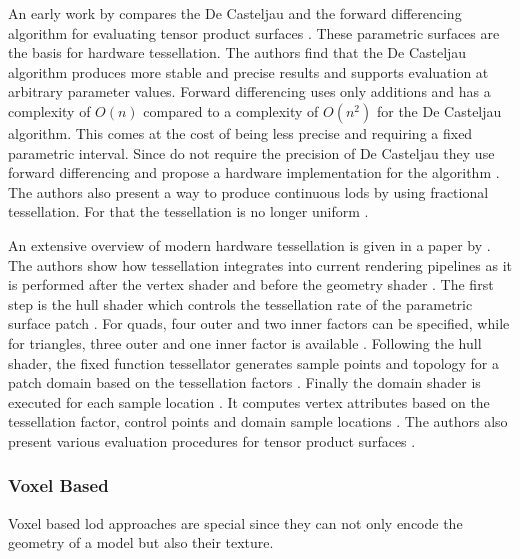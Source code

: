An early work by \citeauthor{moreton_tessellation} compares the De Casteljau and the forward differencing algorithm for evaluating tensor product surfaces \cite{moreton_tessellation}.
These parametric surfaces are the basis for hardware tessellation.
The authors find that the De Casteljau algorithm produces more stable and precise results and supports evaluation at arbitrary parameter values.
Forward differencing uses only additions and has a complexity of $O(n)$ compared to a complexity of $O(n^2)$ for the De Casteljau algorithm.
This comes at the cost of being less precise and requiring a fixed parametric interval.
Since \citeauthor{moreton_tessellation} do not require the precision of De Casteljau they use forward differencing and propose a hardware implementation for the algorithm \cite{moreton_tessellation}.
The authors also present a way to produce continuous \acp{lod} by using fractional tessellation.
For that the tessellation is no longer uniform \cite{moreton_tessellation}.

An extensive overview of modern hardware tessellation is given in a paper by \citeauthor{niessner_tessellation} \cite{niessner_tessellation}.
The authors show how tessellation integrates into current rendering pipelines as it is performed after the vertex shader and before the geometry shader \cite{niessner_tessellation}.
The first step is the hull shader which controls the tessellation rate of the parametric surface patch \cite{niessner_tessellation}.
For quads, four outer and two inner factors can be specified, while for triangles, three outer and one inner factor is available \cite{niessner_tessellation}.
Following the hull shader, the fixed function tessellator generates sample points and topology for a patch domain based on the tessellation factors \cite{niessner_tessellation}.
Finally the domain shader is executed for each sample location \cite{niessner_tessellation}.
It computes vertex attributes based on the tessellation factor, control points and domain sample locations \cite{niessner_tessellation}.
The authors also present various evaluation procedures for tensor product surfaces \cite{niessner_tessellation}.

\subsubsection*{Voxel Based}
Voxel based \ac{lod} approaches are special since they can not only encode the geometry of a model but also their texture.

